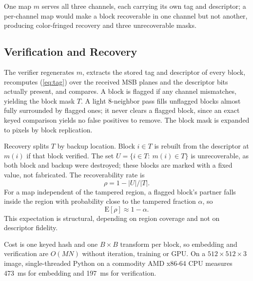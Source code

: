 One map $m$ serves all three channels, each carrying its own tag and descriptor; a per-channel map would make a block recoverable in one channel but not another, producing color-fringed recovery and three unrecoverable masks.

\subsection{Verification and Recovery}
\label{ssec:verify}
The verifier regenerates $m$, extracts the stored tag and descriptor of every block, recomputes (\ref{eq:tag}) over the received MSB planes and the descriptor bits actually present, and compares. A block is flagged if any channel mismatches, yielding the block mask $T$. A light 8-neighbor pass fills unflagged blocks almost fully surrounded by flagged ones; it never clears a flagged block, since an exact keyed comparison yields no false positives to remove. The block mask is expanded to pixels by block replication.

Recovery splits $T$ by backup location. Block $i\in T$ is rebuilt from the descriptor at $m(i)$ if that block verified. The set $U=\{i\in T:\ m(i)\in T\}$ is unrecoverable, as both block and backup were destroyed; these blocks are marked with a fixed value, not fabricated. The recoverability rate is
\begin{equation}
\rho=1-|U|/|T|.
\label{eq:rho}
\end{equation}
For a map independent of the tampered region, a flagged block's partner falls inside the region with probability close to the tampered fraction $\alpha$, so
\begin{equation}
\mathrm{E}[\rho]\approx 1-\alpha.
\label{eq:bound}
\end{equation}
This expectation is structural, depending on region coverage and not on descriptor fidelity.

Cost is one keyed hash and one $B\times B$ transform per block, so embedding and verification are $O(MN)$ without iteration, training or GPU. On a $512\times512\times3$ image, single-threaded Python on a commodity AMD x86-64 CPU measures 473~ms for embedding and 197~ms for verification.
